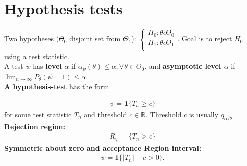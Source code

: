 \section{Hypothesis tests}

Two hypotheses ($\Theta_0$ disjoint set from $\Theta_1$):
$\begin{cases}
		H_0: \theta \epsilon \Theta_0\\
		H_1: \theta \epsilon \Theta_1\\
\end{cases}$. Goal is to reject $H_0$ using a test statistic.\\

A test $\psi$ has \textbf{level $\alpha$} if $\alpha_{\psi}(\theta) \leq \alpha, \forall \theta \in \Theta_0.$ and \textbf{asymptotic level $\alpha$} if $\lim _{n \to \infty } P_\theta ( \psi = 1) \leq \alpha$.\\

\textbf{A hypothesis-test} has the form 

\begin{align*}
\psi = \textbf{1} \lbrace  T_n \geq c \rbrace
\end{align*}
for some test statistic $T_n$ and threshold $c \in \mathbb{R}$. Threshold $c$ is usually $q_{\alpha/2}$\\
\textbf{Rejection region:}
\begin{align*}
R_{\psi} = \lbrace T_n > c \rbrace
\end{align*}
\textbf{Symmetric about zero and acceptance Region interval:}
\begin{align*}
\psi = \mathbf{1}\{  |T_n| - c > 0 \} .
\end{align*}

